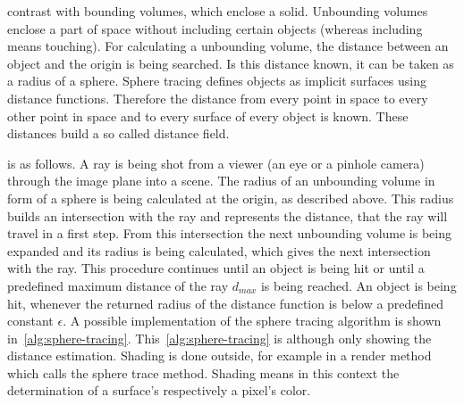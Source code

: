 \documentclass[%
    a4paper,    %
    justified,  %
    nobib,      %
    openany     %
]{tufte-book}
\begin{document}
 contrast with bounding volumes, which enclose a
solid. Unbounding volumes enclose a part of space without including certain
objects (whereas including means touching). For calculating a unbounding volume,
the distance between an object and the origin is being searched. Is this
distance known, it can be taken as a radius of a sphere. Sphere tracing defines
objects as implicit surfaces using distance functions. Therefore the distance
from every point in space to every other point in space and to every surface of
every object is known. These distances build a so called distance field.

 is as follows. A ray is being shot
from a viewer (an eye or a pinhole camera) through the image plane into a scene.
The radius of an unbounding volume in form of a sphere is being calculated at
the origin, as described above. This radius builds an intersection with the ray
and represents the distance, that the ray will travel in a first step. From this
intersection the next unbounding volume is being expanded and its radius is
being calculated, which gives the next intersection with the ray. This procedure
continues until an object is being hit or until a predefined maximum distance of
the ray $d_{max}$ is being reached. An object is being hit, whenever the
returned radius of the distance function is below a predefined constant
$\epsilon$. A possible implementation of the sphere tracing algorithm is shown
in~\autoref{alg:sphere-tracing}. This~\autoref{alg:sphere-tracing} is although
only showing the distance estimation. Shading is done outside, for example in a
render method which calls the sphere trace method. Shading means in this context
the determination of a surface's respectively a pixel's color.
\end{document}
